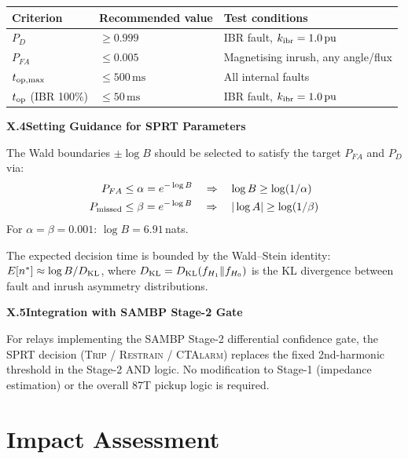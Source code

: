 \documentclass[11pt, a4paper]{article}
\newcommand{\ms}{\,\text{ms}}
\newcommand{\pu}{\,\text{pu}}
\begin{document}
\begin{propbox}
  \begin{center}
  \begin{tabular}{lll}
    \toprule
    \textbf{Criterion} & \textbf{Recommended value} & \textbf{Test conditions} \\
    \midrule
    $P_D$ & $\geq 0.999$ & IBR fault, $k_{\rm ibr} = 1.0\pu$ \\
    $P_{FA}$ & $\leq 0.005$ & Magnetising inrush, any angle/flux \\
    $t_{\rm op,max}$ & $\leq 500\ms$ & All internal faults \\
    $t_{\rm op}$ (IBR 100\%) & $\leq 50\ms$ & IBR fault, $k_{\rm ibr} = 1.0\pu$ \\
    \bottomrule
  \end{tabular}
  \end{center}

  \medskip
  \textbf{X.4\quad Setting Guidance for SPRT Parameters}

  The Wald boundaries $\pm\log B$ should be selected to satisfy the target
  $P_{FA}$ and $P_D$ via:
  \begin{align*}
    P_{FA} &\leq \alpha = e^{-\log B} \quad\Rightarrow\quad
      \log B \geq \log(1/\alpha) \\
    P_{\rm missed} &\leq \beta = e^{-\log B} \quad\Rightarrow\quad
      |\log A| \geq \log(1/\beta)
  \end{align*}
  For $\alpha = \beta = 0.001$: $\log B = 6.91\,$nats.

  The expected decision time is bounded by the Wald--Stein identity:
  $E[n^*] \approx \log B / D_{\rm KL}$, where
  $D_{\rm KL} = D_{\rm KL}(f_{H_1} \| f_{H_0})$ is the KL divergence
  between fault and inrush asymmetry distributions.

  \medskip
  \textbf{X.5\quad Integration with SAMBP Stage-2 Gate}

  For relays implementing the SAMBP Stage-2 differential confidence gate,
  the SPRT decision (\textsc{Trip} / \textsc{Restrain} / \textsc{CTAlarm})
  replaces the fixed 2nd-harmonic threshold in the Stage-2 AND logic.
  No modification to Stage-1 (impedance estimation) or the overall 87T
  pickup logic is required.
\end{propbox}

\section{Impact Assessment}
\end{document}
